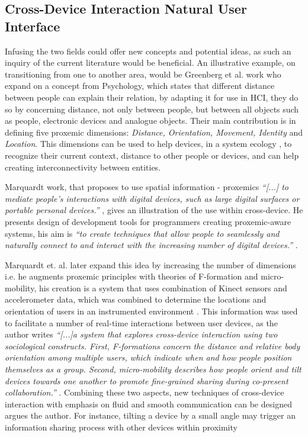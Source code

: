 \subsection{Cross-Device Interaction Natural User Interface}
Infusing the two fields could offer new concepts and potential ideas, as such an inquiry of the current literature would be beneficial. 
An illustrative example, on transitioning from one to another area, would be Greenberg et al. work \cite{Greenberg:2011} who expand on a concept from Psychology, which states that different distance between people can explain their relation, by adapting it for use in HCI, they do so by concerning distance, not only between people, but between all objects such as people, electronic devices and analogue objects. Their main contribution is in defining five proxemic dimensions: \emph{Distance, Orientation, Movement, Identity} and \emph{Location}. This dimensions can be used to help devices, in a system ecology , to recognize their current context, distance to other people or devices, and can help creating interconnectivity between entities. 

Marquardt work, that proposes to use spatial information - proxemics {\em``[...] to mediate people's interactions with digital devices, such as large digital surfaces or portable personal devices.''} \cite{Marquardt:2011}, gives an illustration of the use within cross-device. He presents design of development tools for programmers creating proxemic-aware systems, his aim is {\em``to create techniques that allow people to seamlessly and naturally connect to and interact with the increasing number of digital devices.''} \cite{Marquardt:2011}. 


Marquardt et. al. later expand this idea by increasing the number of dimensions i.e. he augments proxemic principles with theories of F-formation and micro-mobility, his creation is a system that uses combination of Kinect sensors and accelerometer data, which was combined to determine the locations and orientation of users in an instrumented environment . This information was used to facilitate a number of real-time interactions between user devices, as the author writes {\em``[...]a system that explores cross-device interaction using two sociological constructs. First, F-formations concern the distance and relative body orientation among multiple users, which indicate when and how people position themselves as a group. Second, micro-mobility describes how people orient and tilt devices towards one another to promote fine-grained sharing during co-present collaboration.''} \cite{Marquardt:2012}. Combining these two aspects, new techniques of cross-device interaction with emphasis on fluid and smooth communication can be designed argues the author. For instance, tilting a device by a small angle may trigger an information sharing process with other devices within proximity\\ 



